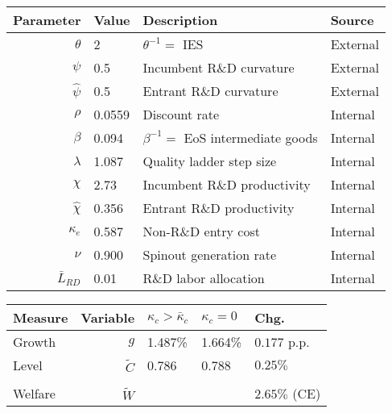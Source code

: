 \documentclass[ecta,nameyear,final]{econsocart}
\theoremstyle{definition}
\begin{document}
\begin{table}[]
	\centering
	\label{calibration_incumbentDRS_parameters}
	\begin{tabular}{rlll}
		\toprule \toprule
		Parameter & Value & Description & Source \tabularnewline
		\midrule
		$\theta$ & 2 & $\theta^{-1} = $ IES & External 
		\tabularnewline
		$\psi$ & 0.5 & Incumbent R\&D curvature & External \tabularnewline
		$\hat{\psi}$ & 0.5 & Entrant R\&D curvature & External \tabularnewline
		$\rho$ & 0.0559 & Discount rate  & Internal \tabularnewline
		$\beta$ & 0.094 & $\beta^{-1} = $ EoS intermediate goods & Internal \tabularnewline 
		$\lambda$ & 1.087 & Quality ladder step size & Internal 
		\tabularnewline
		$\chi$ & 2.73 & Incumbent R\&D productivity & Internal 
		\tabularnewline
		$\hat{\chi}$ & 0.356 & Entrant R\&D productivity & Internal \tabularnewline 
		$\kappa_e$ & 0.587 & Non-R\&D entry cost & Internal \tabularnewline
		$\nu$ & 0.900 & Spinout generation rate  & Internal\tabularnewline
		$\bar{L}_{RD}$ & 0.01 & R\&D labor allocation  & Internal \tabularnewline
		\bottomrule
	\end{tabular}
\end{table}

\begin{table}
	\centering
	\label{reducing_kappa_c_table_incumbentRDS}
	\begin{tabular}{lrlll}
		\toprule \toprule
		Measure & Variable & $\kappa_c > \bar{\kappa}_c$ & $\kappa_c = 0$ & Chg. \tabularnewline
		\midrule
		Growth & $g$ & 1.487\% & 1.664\% & $0.177$ p.p. \tabularnewline
		Level & $\tilde{C}$  & 0.786 &  0.788 & $0.25\%$ \tabularnewline 
		\tabularnewline
		Welfare & $\tilde{W}$  &  & & $2.65\%$ (CE)  \tabularnewline
		\bottomrule
	\end{tabular}
\end{table}
\end{document}
